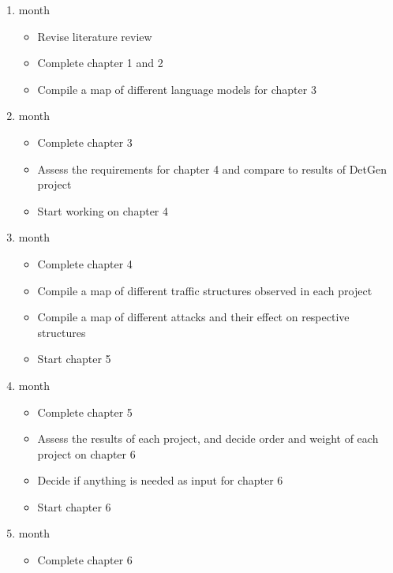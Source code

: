 \documentclass[a4paper,12pt,twoside]{article}
\begin{document}
\begin{enumerate}

\item month
\begin{itemize}
\item Revise literature review
\item Complete chapter 1 and 2
\item Compile a map of different language models for chapter 3
\end{itemize}
\item month
\begin{itemize}
\item Complete chapter 3
\item Assess the requirements for chapter 4 and compare to results of DetGen project
\item Start working on chapter 4
\end{itemize}

\item month
\begin{itemize}
\item Complete chapter 4
\item Compile a map of different traffic structures observed in each project
\item Compile a map of different attacks and their effect on respective structures
\item Start chapter 5

\end{itemize}
\item month
\begin{itemize}
\item Complete chapter 5
\item Assess the results of each project, and decide order and weight of each project on chapter 6
\item Decide if anything is needed as input for chapter 6
\item Start chapter 6
\end{itemize}

\item month
\begin{itemize}
\item Complete chapter 6
\end{itemize}
\end{enumerate}





\end{document}
